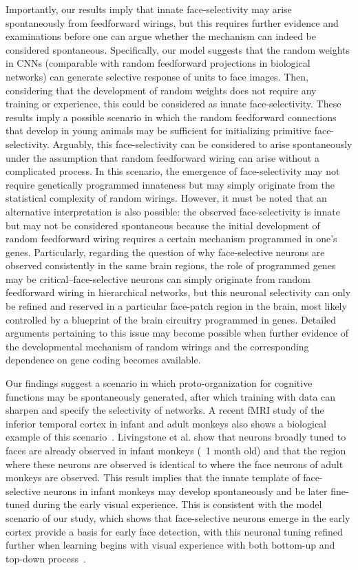 \documentclass[sn-mathphys]{sn-jnl}%
\theoremstyle{thmstyleone}%
\theoremstyle{thmstyletwo}%
\theoremstyle{thmstylethree}%
\begin{document}
Importantly, our results imply that innate face-selectivity may arise spontaneously from feedforward wirings, 
but this requires further evidence and examinations before one can argue whether the mechanism can indeed be considered spontaneous.
Specifically, our model suggests that the random weights in CNNs (comparable with random feedforward projections in biological networks) can generate selective response of units to face images.
Then, considering that the development of random weights does not require any training or experience, this could be considered as innate face-selectivity.
These results imply a possible scenario in which the random feedforward connections that develop in young animals may be sufficient for initializing primitive face-selectivity.
Arguably, this face-selectivity can be considered to arise spontaneously under the assumption that random feedforward wiring can arise without a complicated process.
In this scenario, the emergence of face-selectivity may not require genetically programmed innateness but may simply originate from the statistical complexity of random wirings.
However, it must be noted that an alternative interpretation is also possible:
the observed face-selectivity is innate but may not be considered spontaneous because the initial development of random feedforward wiring requires a certain mechanism programmed in one's genes.
Particularly, regarding the question of why face-selective neurons are observed consistently in the same brain regions, the role of programmed genes may be critical--face-selective neurons can simply originate from random feedforward wiring in hierarchical networks,
but this neuronal selectivity can only be refined and reserved in a particular face-patch region in the brain, 
most likely controlled by a blueprint of the brain circuitry programmed in genes.
Detailed arguments pertaining to this issue may become possible when further evidence of the developmental mechanism of random wirings and the corresponding dependence on gene coding becomes available.


Our findings suggest a scenario in which proto-organization for cognitive functions may be spontaneously generated, 
after which training with data can sharpen and specify the selectivity of networks.
A recent fMRI study of the inferior temporal cortex in infant and adult monkeys also shows a biological example of this scenario~\cite{livingstone2017development}.
Livingstone et al. show that neurons broadly tuned to faces are already observed in infant monkeys (~1 month old) 
and that the region where these neurons are observed is identical to where the face neurons of adult monkeys are observed.
This result implies that the innate template of face-selective neurons in infant monkeys may develop spontaneously and be later fine-tuned during the early visual experience.
This is consistent with the model scenario of our study, which shows that face-selective neurons emerge in the early cortex provide a basis for early face detection,
with this neuronal tuning refined further when learning begins with visual experience with both bottom-up and top-down process~\cite{yan2018bottom,epshtein2008image}.
\end{document}

